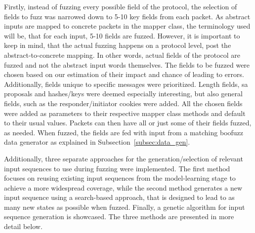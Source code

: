 Firstly, instead of fuzzing every possible field of the protocol, the selection of fields to fuzz was narrowed down to 5-10 key fields from each packet. As abstract inputs are mapped to concrete packets in the mapper class, the terminology used will be, that for each input, 5-10 fields are fuzzed. However, it is important to keep in mind, that the actual fuzzing happens on a protocol level, post the abstract-to-concrete mapping. In other words, actual fields of the protocol are fuzzed and not the abstract input words themselves. The fields to be fuzzed were chosen based on our estimation of their impact and chance of leading to errors. Additionally, fields unique to specific messages were prioritized. Length fields, \ac{sa} proposals and hashes/keys were deemed especially interesting, but also general fields, such as the responder/initiator cookies were added. All the chosen fields were added as parameters to their respective mapper class methods and default to their usual values. Packets can then have all or just some of their fields fuzzed, as needed. When fuzzed, the fields are fed with input from a matching boofuzz data generator as explained in Subsection~\ref{subsec:data_gen}.

Additionally, three separate approaches for the generation/selection of relevant input sequences to use during fuzzing were implemented. The first method focuses on reusing existing input sequences from the model-learning stage to achieve a more widespread coverage, while the second method generates a new input sequence using a search-based approach, that is designed to lead to as many new states as possible when fuzzed. Finally, a genetic algorithm for input sequence generation is showcased. The three methods are presented in more detail below.

